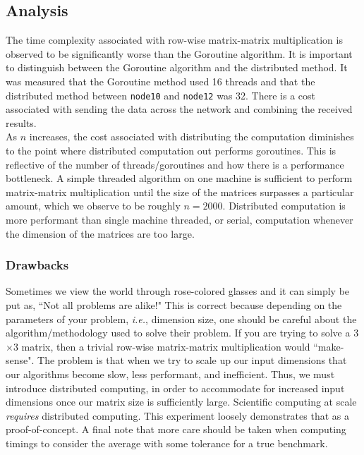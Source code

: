 \documentclass[12pt]{article}
\begin{document}
		\subsection*{Analysis}					
			The time complexity associated with row-wise matrix-matrix multiplication is observed to be significantly worse than the Goroutine algorithm. It is important to distinguish between the Goroutine algorithm and the distributed method. It was measured that the Goroutine method used 16 threads and that the distributed method between \texttt{node10} and \texttt{node12} was 32. There is a cost associated with sending the data across the network and combining the received results.\\
			
			As $n$ increases, the cost associated with distributing the computation diminishes to the point where distributed computation out performs goroutines. This is reflective of the number of threads/goroutines and how there is a performance bottleneck. A simple threaded algorithm on one machine is sufficient to perform matrix-matrix multiplication until the size of the matrices surpasses a particular amount, which we observe to be roughly $n=2000$. Distributed computation is more performant than single machine threaded, or serial, computation whenever the dimension of the matrices are too large.\\
			
		\subsubsection*{Drawbacks}
			Sometimes we view the world through rose-colored glasses and it can simply be put as, ``Not all problems are alike!" This is correct because depending on the parameters of your problem, \textit{i.e.}, dimension size, one should be careful about the algorithm/methodology used to solve their problem. If you are trying to solve a 3$\times$3 matrix, then a trivial row-wise matrix-matrix multiplication would ``make-sense". The problem is that when we try to scale up our input dimensions that our algorithms become slow, less performant, and inefficient. Thus, we must introduce distributed computing, in order to accommodate for increased input dimensions once our matrix size is sufficiently large. Scientific computing at scale \textit{requires} distributed computing. This experiment loosely demonstrates that as a proof-of-concept. A final note that more care should be taken when computing timings to consider the average with some tolerance for a true benchmark.
			
\end{document}
